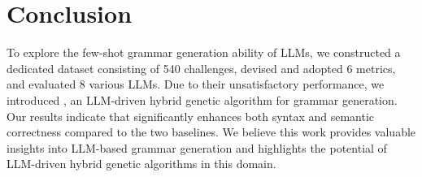 \section{Conclusion}
To explore the few-shot grammar generation ability of LLMs, we constructed a dedicated dataset consisting of 540 challenges, devised and adopted 6 metrics, and evaluated 8 various LLMs. Due to their unsatisfactory performance, we introduced \NAME, an LLM-driven hybrid genetic algorithm for grammar generation. Our results indicate that \NAME significantly enhances both syntax and semantic correctness compared to the two baselines. We believe this work provides valuable insights into LLM-based grammar generation and highlights the potential of LLM-driven hybrid genetic algorithms in this domain.